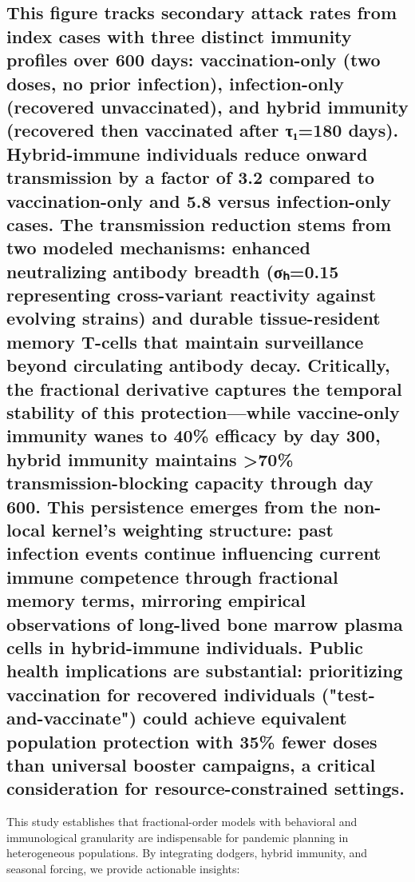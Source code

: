 \documentclass[10pt]{NSP1}
\begin{document}
\subsection*{}

\par\vspace{8.7pt}\smallskip

\subsection*{This figure tracks secondary attack rates from index cases with three distinct immunity profiles over 600 days: vaccination-only (two doses, no prior infection), infection-only (recovered unvaccinated), and hybrid immunity (recovered then vaccinated after τ₁=180 days). Hybrid-immune individuals reduce onward transmission by a factor of 3.2 compared to vaccination-only and 5.8 versus infection-only cases. The transmission reduction stems from two modeled mechanisms: enhanced neutralizing antibody breadth (σₕ=0.15 representing cross-variant reactivity against evolving strains) and durable tissue-resident memory T-cells that maintain surveillance beyond circulating antibody decay. Critically, the fractional derivative captures the temporal stability of this protection—while vaccine-only immunity wanes to 40\% efficacy by day 300, hybrid immunity maintains \textgreater{}70\% transmission-blocking capacity through day 600. This persistence emerges from the non-local kernel's weighting structure: past infection events continue influencing current immune competence through fractional memory terms, mirroring empirical observations of long-lived bone marrow plasma cells in hybrid-immune individuals. Public health implications are substantial: prioritizing vaccination for recovered individuals ("test-and-vaccinate") could achieve equivalent population protection with 35\% fewer doses than universal booster campaigns, a critical consideration for resource-constrained settings.}

\par\medskip{}\smallskip

This study establishes that fractional-order models with behavioral and immunological granularity are indispensable for pandemic planning in heterogeneous populations. By integrating dodgers, hybrid immunity, and seasonal forcing, we provide actionable insights:
\end{document}
